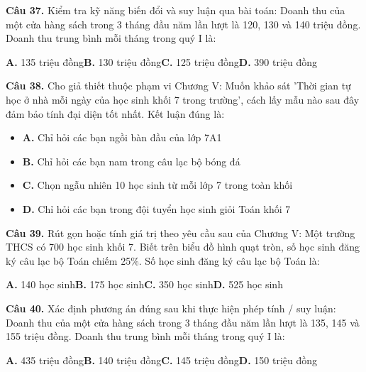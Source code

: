 \documentclass[11pt,a4paper]{article}
\begin{document}
\textbf{\color{primary} Câu 37.} Kiểm tra kỹ năng biến đổi và suy luận qua bài toán: Doanh thu của một cửa hàng sách trong 3 tháng đầu năm lần lượt là 120, 130 và 140 triệu đồng. Doanh thu trung bình mỗi tháng trong quý I là:\par
\hspace*{1.5em}\textbf{A.} 135 triệu đồng\quad\quad \textbf{B.} 130 triệu đồng\quad\quad \textbf{C.} 125 triệu đồng\quad\quad \textbf{D.} 390 triệu đồng\par\vspace{2pt}
\textbf{\color{primary} Câu 38.} Cho giả thiết thuộc phạm vi Chương V: Muốn khảo sát 'Thời gian tự học ở nhà mỗi ngày của học sinh khối 7 trong trường', cách lấy mẫu nào sau đây đảm bảo tính đại diện tốt nhất. Kết luận đúng là:\par
\begin{itemize}\setlength{\itemsep}{1pt}\setlength{\parskip}{0pt}
  \item[] \textbf{A.} Chỉ hỏi các bạn ngồi bàn đầu của lớp 7A1
  \item[] \textbf{B.} Chỉ hỏi các bạn nam trong câu lạc bộ bóng đá
  \item[] \textbf{C.} Chọn ngẫu nhiên 10 học sinh từ mỗi lớp 7 trong toàn khối
  \item[] \textbf{D.} Chỉ hỏi các bạn trong đội tuyển học sinh giỏi Toán khối 7
\end{itemize}\vspace{2pt}
\textbf{\color{primary} Câu 39.} Rút gọn hoặc tính giá trị theo yêu cầu sau của Chương V: Một trường THCS có 700 học sinh khối 7. Biết trên biểu đồ hình quạt tròn, số học sinh đăng ký câu lạc bộ Toán chiếm 25\%. Số học sinh đăng ký câu lạc bộ Toán là:\par
\hspace*{1.5em}\textbf{A.} 140 học sinh\quad\quad \textbf{B.} 175 học sinh\quad\quad \textbf{C.} 350 học sinh\quad\quad \textbf{D.} 525 học sinh\par\vspace{2pt}
\textbf{\color{primary} Câu 40.} Xác định phương án đúng sau khi thực hiện phép tính / suy luận: Doanh thu của một cửa hàng sách trong 3 tháng đầu năm lần lượt là 135, 145 và 155 triệu đồng. Doanh thu trung bình mỗi tháng trong quý I là:\par
\hspace*{1.5em}\textbf{A.} 435 triệu đồng\quad\quad \textbf{B.} 140 triệu đồng\quad\quad \textbf{C.} 145 triệu đồng\quad\quad \textbf{D.} 150 triệu đồng\par\vspace{2pt}
\end{document}
